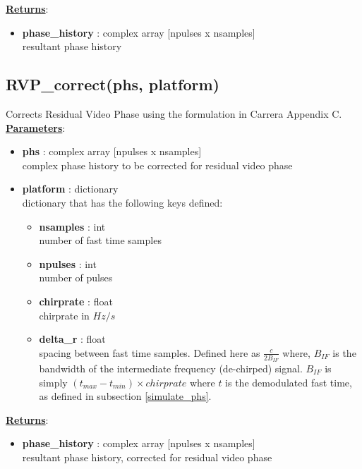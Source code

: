 \documentclass{article}
\newcommand{\defs}[2]{\textbf{{#1}} : {#2}}
\begin{document}
\noindent \underline{\textbf{Returns}}:
\begin{itemize}
	\item \defs{phase\_history}{complex array [npulses x nsamples]}\\
	resultant phase history
\end{itemize}

\newpage

\subsection{RVP\_correct(phs, platform)}
Corrects Residual Video Phase using the formulation in Carrera Appendix C.\\

\noindent \underline{\textbf{Parameters}}:

\begin{itemize}
	\item \defs{phs}{complex array [npulses x nsamples]}\\
  	complex phase history to be corrected for residual video phase
  	\item \defs{platform}{dictionary}\\
  	dictionary that has the following keys defined:
  \begin{itemize}
    \item \defs{nsamples}{int}\\
    	number of fast time samples
    \item \defs{npulses}{int}\\
    	number of pulses
    \item \defs{chirprate}{float}\\
    	chirprate in $Hz/s$
	\item \defs{delta\_r}{float}\\
	   	spacing between fast time samples.  Defined here as $\frac{c}{2B_{IF}}$ where, $B_{IF}$ is the bandwidth of the intermediate frequency (de-chirped) signal.  $B_{IF}$ is simply $(t_{max}-t_{min})\times chirprate$ where $t$ is the demodulated fast time, as defined in subsection \ref{simulate_phs}.
  \end{itemize}
\end{itemize}

\noindent \underline{\textbf{Returns}}:
\begin{itemize}
	\item \defs{phase\_history}{complex array [npulses x nsamples]}\\
	resultant phase history, corrected for residual video phase
\end{itemize}
\end{document}
